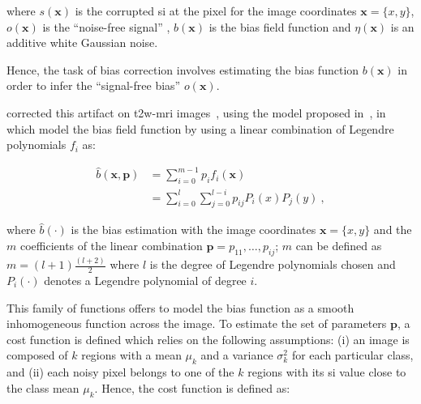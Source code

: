 \noindent where $s(\mathbf{x})$ is the corrupted \ac{si} at the pixel for the image coordinates $\mathbf{x} = \{x,y\}$, $o(\mathbf{x})$ is the ``noise-free signal'' , $b(\mathbf{x})$ is the bias field function and $\eta(\mathbf{x})$ is an additive white Gaussian noise.
%
%
%

Hence, the task of bias correction involves estimating the bias function $b(\mathbf{x})$ in order to infer the ``signal-free bias'' $o(\mathbf{x})$.


\citeauthor{Viswanath2009} corrected this artifact on \ac{t2w}-\ac{mri} images~\cite{Viswanath2009}, using the model proposed in~\cite{Styner2000}, in which \citeauthor{Styner2000} model the bias field function by using a linear combination of Legendre polynomials $f_i$ as:

\begin{align}
	\hat{b}(\mathbf{x},\mathbf{p}) & = \sum_{i=0}^{m-1} p_i f_i(\mathbf{x}) \\ \nonumber
                                       & =  \sum_{i=0}^{l} \sum_{j=0}^{l-i} p_{ij} P_i(x) P_j(y) \ ,
	\label{eq:biascorr}
\end{align}

\noindent where $\hat{b}(\cdot)$ is the bias estimation with the image coordinates $\mathbf{x} = \{x,y\}$ and the $m$ coefficients of the linear combination $\mathbf{p} = {p_{11},\dotsc,p_{ij}}$; $m$ can be defined as $m=(l+1)\frac{(l+2)}{2}$ where $l$ is the degree of Legendre polynomials chosen and $P_i(\cdot)$ denotes a Legendre polynomial of degree $i$.

This family of functions offers to model the bias function as a smooth inhomogeneous function across the image.
To estimate the set of parameters $\mathbf{p}$, a cost function is defined which relies on the following assumptions: (i) an image is composed of $k$ regions with a mean $\mu_k$ and a variance $\sigma^{2}_{k}$ for each particular class, and (ii) each noisy pixel belongs to one of the $k$ regions with its \ac{si} value close to the class mean $\mu_k$.
Hence, the cost function is defined as:

